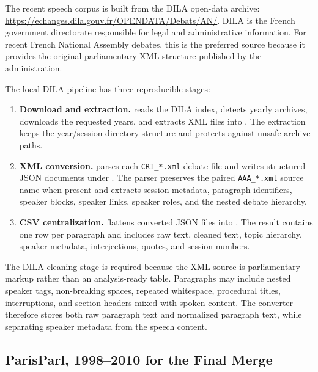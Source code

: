 \documentclass[11pt,a4paper]{article}
\begin{document}
The recent speech corpus is built from the DILA open-data archive:
\url{https://echanges.dila.gouv.fr/OPENDATA/Debats/AN/}. DILA is the French
government directorate responsible for legal and administrative information.
For recent French National Assembly debates, this is the preferred source
because it provides the original parliamentary XML structure published by the
administration.

The local DILA pipeline has three reproducible stages:

\begin{enumerate}
  \item \textbf{Download and extraction.} 
  reads the DILA index, detects yearly archives, downloads the requested years,
  and extracts XML files into . The extraction
  keeps the year/session directory structure and protects against unsafe archive
  paths.

  \item \textbf{XML conversion.}  parses each
  \texttt{CRI\_*.xml} debate file and writes structured JSON documents under
  . The parser preserves the paired
  \texttt{AAA\_*.xml} source name when present and extracts session metadata,
  paragraph identifiers, speaker blocks, speaker links, speaker roles, and the
  nested debate hierarchy.

  \item \textbf{CSV centralization.}  flattens
  converted JSON files into .
  The result contains one row per paragraph and includes raw text, cleaned text,
  topic hierarchy, speaker metadata, interjections, quotes, and session numbers.
\end{enumerate}

The DILA cleaning stage is required because the XML source is parliamentary
markup rather than an analysis-ready table. Paragraphs may include nested
speaker tags, non-breaking spaces, repeated whitespace, procedural titles,
interruptions, and section headers mixed with spoken content. The converter
therefore stores both raw paragraph text and normalized paragraph text, while
separating speaker metadata from the speech content.

\subsection{ParisParl, 1998--2010 for the Final Merge}
\end{document}
